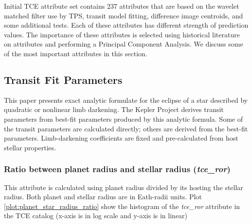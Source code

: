 Initial TCE attribute set contains 237 attributes that are based on the wavelet matched filter use by TPS, transit model fitting, difference image centroids, and some additional tests. Each of these attributes has different strength of prediction values. The importance of these attributes is selected using historical literature on attributes and performing a Principal Component Analysis. We discuss some of the most important attributes in this section.

\subsection{Transit Fit Parameters}

This paper presents exact analytic formulate for the eclipse of a star described by quadratic or nonlinear limb darkening. The Kepler Project derives transit parameters from best-fit parameters produced by this analytic formula. Some of the transit parameters are calculated directly; others are derived from the best-fit parameters. Limb-darkening coefficients are fixed and pre-calculated from host stellar properties.  


\subsubsection{Ratio between planet radius and stellar radius (\emph{tce\_ror})}
This attribute is calculated using planet radius divided by its hosting the stellar radius. Both planet and stellar radius are in Eath-radii units. Plot \ref{plot:planet_star_radius_ratio} show the histogram of the \emph{tce\_ror} attribute in the TCE catalog (x-axis is in log scale and y-axis is in linear)

